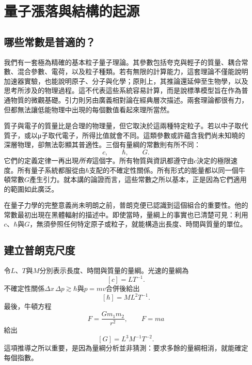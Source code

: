 \chapter{量子漲落與結構的起源}


\section{哪些常數是普適的？}

我們有一套極為精確的基本粒子量子理論。其參數包括夸克與輕子的質量、耦合常數、混合參數、電荷，以及粒子種類。若有無限的計算能力，這套理論不僅能說明加速器實驗，也能說明原子、分子與化學；原則上，其推論還延伸至生物學，以及思考所涉及的物理過程。這不代表這些系統容易計算，而是說標準模型旨在作為普通物質的微觀基礎。引力則另由廣義相對論在經典層次描述。兩套理論都很有力，但都無法讓低能物理中出現的每個數值看起來理所當然。

質子與電子的質量比是合理的物理量，但它取決於這兩種特定粒子。若以中子取代質子，或以{\proseunicodefont μ}子取代電子，所得比值就會不同。這類參數或許蘊含我們尚未知曉的深層物理，卻無法彰顯其普適性。三個有量綱的常數則有所不同：
\[
c,\qquad \hbar,\qquad G.
\]
它們的定義定律一再出現\emph{所有}這個字。所有物質與資訊都遵守由\(c\)決定的極限速度。所有量子系統都服從由\(\hbar\)支配的不確定性關係。所有形式的能量都以同一個牛頓常數\(G\)產生引力。就本講的論證而言，這些常數之所以基本，正是因為它們適用的範圍如此廣泛。

在量子力學的完整意義尚未明朗之前，普朗克便已認識到這個組合的重要性。他的常數最初出現在黑體輻射的描述中。即使當時，量綱上的事實也已清楚可見：利用\(c\)、\(\hbar\)與\(G\)，無須參照任何特定原子或粒子，就能構造出長度、時間與質量的單位。

\section{建立普朗克尺度}

令\(L\)、\(T\)與\(M\)分別表示長度、時間與質量的量綱。光速的量綱為
\[
[c]=LT^{-1}.
\]
不確定性關係\(\Delta x\,\Delta p\gtrsim\hbar\)與\(p=mv\)合併後給出
\[
[\hbar]=ML^2T^{-1}.
\]
最後，牛頓方程
\[
F=\frac{Gm_1m_2}{r^2},
\qquad
F=ma
\]
給出
\[
[G]=L^3M^{-1}T^{-2}.
\]
這項推導之所以重要，是因為量綱分析並非猜測：要求多餘的量綱相消，就能確定每個指數。

